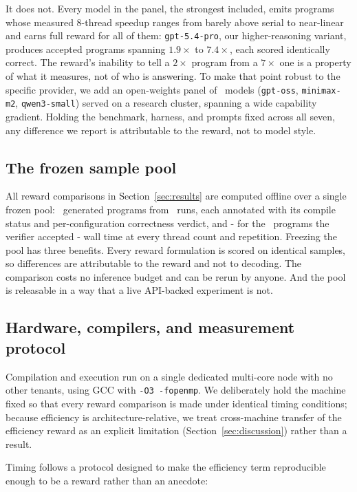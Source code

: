 It does not. Every model in the panel, the strongest included, emits programs
whose measured 8-thread speedup ranges from barely above serial to near-linear
and earns full reward for all of them: \texttt{gpt-5.4-pro}, our
higher-reasoning variant, produces accepted programs spanning $1.9\times$ to
$7.4\times$, each scored identically correct. The reward's inability to tell a
$2\times$ program from a $7\times$ one is a property of what it measures, not of
who is answering. To make that point robust to the specific provider, we add an
open-weights panel of
\NOpenModels\ models (\texttt{gpt-oss}, \texttt{minimax-m2},
\texttt{qwen3-small}) served on a research cluster, spanning a wide capability
gradient. Holding the benchmark, harness, and prompts fixed across all seven,
any difference we report is attributable to the reward, not to model style.

\subsection{The frozen sample pool}

All reward comparisons in Section~\ref{sec:results} are computed offline over
a single frozen pool: \NSamples\ generated programs from \NRuns\ runs, each
annotated with its compile status and per-configuration correctness verdict,
and - for the \NAccepted\ programs the verifier accepted - wall time at every
thread count and repetition. Freezing the pool has three
benefits. Every reward formulation is scored on identical samples, so
differences are attributable to the reward and not to decoding. The comparison
costs no inference budget and can be rerun by anyone. And the pool is
releasable in a way that a live API-backed experiment is not.

\subsection{Hardware, compilers, and measurement protocol}
\label{sec:setup-protocol}

Compilation and execution run on a single dedicated multi-core node with no
other tenants, using GCC with \texttt{-O3 -fopenmp}. We deliberately hold the
machine fixed so that every reward comparison is made under identical timing
conditions; because efficiency is architecture-relative, we treat cross-machine
transfer of the efficiency reward as an explicit limitation
(Section~\ref{sec:discussion}) rather than a result.

Timing follows a protocol designed to make the efficiency term reproducible
enough to be a reward rather than an anecdote:

